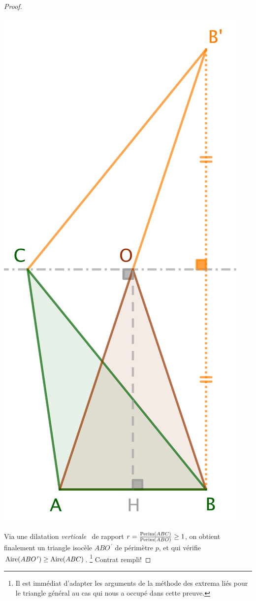 \begin{proof}
	\begin{center}
		\includegraphics[scale=.4]{content/triangle-one-side-fixed/triangle-proof.png}
	\end{center}
	
	Via une dilatation \og \emph{verticale} \fg\ de rapport $r = \frac{\mathrm{Perim}(ABC)}{\mathrm{Perim}(ABO)} \geq 1$, on obtient finalement un triangle isocèle $ABO^{\,\prime}$ de périmètre $p$, et qui vérifie $\mathrm{Aire}(ABO^{\,\prime}) \geq \mathrm{Aire}(ABC)$.
	\footnote{
		Il est immédiat d'adapter les arguments de la méthode des extrema liés pour le triangle général au cas qui nous a occupé dans cette preuve.
	}
	Contrat rempli!
\end{proof}